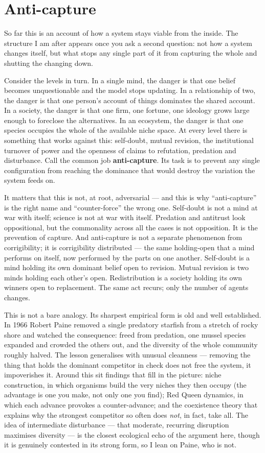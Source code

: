 \documentclass[11pt, a4paper]{report}
\begin{document}
\section{Anti-capture}

So far this is an account of how a system stays viable from the inside. The structure I am after appears once you ask a second question: not how a system changes itself, but what stops any single part of it from capturing the whole and shutting the changing down.

Consider the levels in turn. In a single mind, the danger is that one belief becomes unquestionable and the model stops updating. In a relationship of two, the danger is that one person's account of things dominates the shared account. In a society, the danger is that one firm, one fortune, one ideology grows large enough to foreclose the alternatives. In an ecosystem, the danger is that one species occupies the whole of the available niche space. At every level there is something that works against this: self-doubt, mutual revision, the institutional turnover of power and the openness of claims to refutation, predation and disturbance. Call the common job \textbf{anti-capture}. Its task is to prevent any single configuration from reaching the dominance that would destroy the variation the system feeds on.

It matters that this is not, at root, adversarial --- and this is why ``anti-capture'' is the right name and ``counter-force'' the wrong one. Self-doubt is not a mind at war with itself; science is not at war with itself. Predation and antitrust look oppositional, but the commonality across all the cases is not opposition. It is the prevention of capture. And anti-capture is not a separate phenomenon from corrigibility; it is corrigibility distributed --- the same holding-open that a mind performs on itself, now performed by the parts on one another. Self-doubt is a mind holding its own dominant belief open to revision. Mutual revision is two minds holding each other's open. Redistribution is a society holding its own winners open to replacement. The same act recurs; only the number of agents changes.

This is not a bare analogy. Its sharpest empirical form is old and well established. In 1966 Robert Paine removed a single predatory starfish from a stretch of rocky shore and watched the consequence: freed from predation, one mussel species expanded and crowded the others out, and the diversity of the whole community roughly halved. The lesson generalises with unusual cleanness --- removing the thing that holds the dominant competitor in check does not free the system, it impoverishes it. Around this sit findings that fill in the picture: niche construction, in which organisms build the very niches they then occupy (the advantage is one you make, not only one you find); Red Queen dynamics, in which each advance provokes a counter-advance; and the coexistence theory that explains why the strongest competitor so often does \textit{not}, in fact, take all. The idea of intermediate disturbance --- that moderate, recurring disruption maximises diversity --- is the closest ecological echo of the argument here, though it is genuinely contested in its strong form, so I lean on Paine, who is not.
\end{document}
